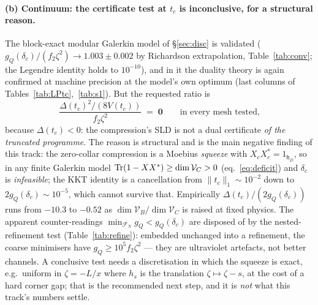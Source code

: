 \documentclass[11pt]{article}
\newcommand{\hh}{\mathfrak h}
\begin{document}
\paragraph{(b) Continuum: the certificate test at $t_c$ is inconclusive, for a structural reason.}
The block-exact modular Galerkin model of \S\ref{sec:disc} is validated
($g_Q(\delta_c)/(f_2\zeta^2)\to1.003\pm0.002$ by Richardson extrapolation, Table~\ref{tab:conv};
the Legendre identity holds to $10^{-10}$), and in it the duality theory is again confirmed at
machine precision at the model's own optimum (last columns of
Tables~\ref{tab:LPtc},~\ref{tab:s1}).  But the requested ratio is
\[
 \frac{\Delta(t_c)^2/(8V(t_c))}{f_2\zeta^2}\;=\;\mathbf 0\qquad\text{in every mesh tested,}
\]
because $\Delta(t_c)<0$: the compression's SLD is not a dual certificate \emph{of the truncated
programme}.  The reason is structural and is the main negative finding of this track: the
zero-collar compression is a Moebius \emph{squeeze} with $X_cX_c^*=1_{\hh_D}$, so in any finite
Galerkin model $\operatorname{Tr}(1-XX^*)\ge\dim\mathcal V_C>0$ (eq.~\eqref{eq:deficit}) and $\delta_c$ is
\emph{infeasible}; the KKT identity is a cancellation from $\|t_c\|_1\sim10^{-2}$ down to
$2g_Q(\delta_c)\sim10^{-5}$, which cannot survive that.  Empirically $\Delta(t_c)/(2g_Q(\delta_c))$
runs from $-10.3$ to $-0.52$ as $\dim\mathcal V_B/\dim\mathcal V_C$ is raised at fixed physics.
The apparent counter-readings $\min_{\mathcal F_N}g_Q<g_Q(\delta_c)$ are disposed of by the
nested-refinement test (Table~\ref{tab:refine}): embedded unchanged into a refinement, the coarse
minimisers have $g_Q\ge10^5f_2\zeta^2$ --- they are ultraviolet artefacts, not better channels.
A conclusive test needs a discretisation in which the squeeze is exact, e.g.\ uniform in
$\zeta=-L/x$ where $h_s$ is the translation $\zeta\mapsto\zeta-s$, at the cost of a hard corner
gap; that is the recommended next step, and it is \emph{not} what this track's numbers settle.
\end{document}
